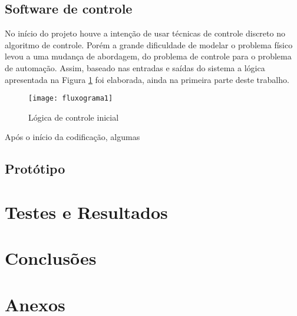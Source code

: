 \documentclass[a4paper,11pt]{article}
\begin{document}
%
\subsection{Software de controle}
\label{sec:software}
No início do projeto houve a intenção de usar técnicas de controle discreto no algoritmo de controle.
Porém a grande dificuldade de modelar o problema físico levou a uma mudança de
abordagem, do problema de controle para o problema de automação. Assim, baseado
nas entradas e saídas do sistema a lógica apresentada na Figura
\ref{fig:fluxograma1} foi elaborada, ainda na primeira parte deste trabalho.
\begin{figure}[ht]
 \begin{center}
  \texttt{[image: fluxograma1]}
 \end{center}
 \caption{Lógica de controle inicial}
 \label{fig:fluxograma1}
\end{figure}
Após o início da codificação, algumas 

 
%
\subsection{Protótipo}
\label{sec:prototipo}


\pagebreak
%
\section{Testes e Resultados}
\label{sec:resultados}

\pagebreak
%
\section{Conclusões}
\label{sec:conclusoes}


\pagebreak
%
\section{Anexos}
\label{sec:anexos}

%
\end{document}
